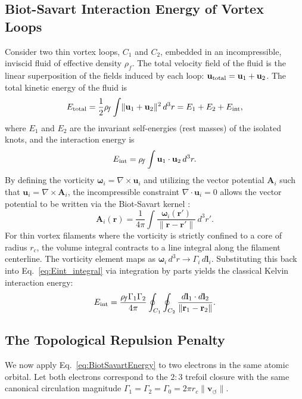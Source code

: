 \documentclass[11pt,a4paper]{article}
\begin{document}
\subsection{Biot-Savart Interaction Energy of Vortex Loops}
Consider two thin vortex loops, $C_1$ and $C_2$, embedded in an incompressible, inviscid fluid of effective density $\rho_{\!f}$. The total velocity field of the fluid is the linear superposition of the fields induced by each loop: $\mathbf{u}_{\rm total} = \mathbf{u}_1 + \mathbf{u}_2$. The total kinetic energy of the fluid is
\begin{equation}
\label{eq:Etotal_fluid}
E_{\rm total} = \frac{1}{2}\rho_{\!f} \int \lVert \mathbf{u}_1 + \mathbf{u}_2 \rVert^2 \, d^3r
= E_1 + E_2 + E_{\rm int},
\end{equation}
where $E_1$ and $E_2$ are the invariant self-energies (rest masses) of the isolated knots, and the interaction energy is
\begin{equation}
\label{eq:Eint_integral}
E_{\rm int} = \rho_{\!f} \int \mathbf{u}_1 \cdot \mathbf{u}_2 \, d^3r.
\end{equation}
By defining the vorticity $\boldsymbol{\omega}_i = \nabla \times \mathbf{u}_i$ and utilizing the vector potential $\mathbf{A}_i$ such that $\mathbf{u}_i = \nabla \times \mathbf{A}_i$, the incompressible constraint $\nabla \cdot \mathbf{u}_i = 0$ allows the vector potential to be written via the Biot-Savart kernel \cite{Batchelor1967}:
\begin{equation}
\label{eq:VectorPotential}
\mathbf{A}_i(\mathbf{r}) = \frac{1}{4\pi} \int \frac{\boldsymbol{\omega}_i(\mathbf{r}')}{\lVert \mathbf{r} - \mathbf{r}' \rVert} \, d^3r'.
\end{equation}
For thin vortex filaments where the vorticity is strictly confined to a core of radius $r_c$, the volume integral contracts to a line integral along the filament centerline. The vorticity element maps as $\boldsymbol{\omega}_i \, d^3r \to \Gamma_i \, d\mathbf{l}_i$. Substituting this back into Eq.~\eqref{eq:Eint_integral} via integration by parts yields the classical Kelvin interaction energy:
\begin{equation}
\label{eq:BiotSavartEnergy}
E_{\rm int} = \frac{\rho_{\!f} \Gamma_1 \Gamma_2}{4\pi} \oint_{C_1} \oint_{C_2} \frac{d\mathbf{l}_1 \cdot d\mathbf{l}_2}{\lVert \mathbf{r}_1 - \mathbf{r}_2 \rVert}.
\end{equation}

\subsection{The Topological Repulsion Penalty}
We now apply Eq.~\eqref{eq:BiotSavartEnergy} to two electrons in the same atomic orbital. Let both electrons correspond to the $2{:}3$ trefoil closure with the same canonical circulation magnitude $\Gamma_1 = \Gamma_2 = \Gamma_0 = 2\pi r_c \lVert\mathbf{v}_{\!\boldsymbol{\circlearrowleft}}\rVert$.
\end{document}

